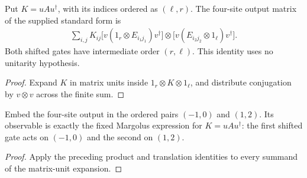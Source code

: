 \begin{lemma}
    \label{lem:mpu_two_link_output_matrix_units}
    \leanok
    Put $K=uAu^\dagger$, with its indices ordered as $(\ell,r)$.
    The four-site output matrix of the supplied standard form is
    \begin{align}
        \sum_{i,j}K_{ij}
        \bigl[v(1_r\otimes E_{i_1j_1})v^\dagger\bigr]
        \otimes
        \bigl[v(E_{i_2j_2}\otimes 1_\ell)v^\dagger\bigr].
    \end{align}
    Both shifted gates have intermediate order $(r,\ell)$. This identity
    uses no unitarity hypothesis.
\end{lemma}
\begin{proof}
    \leanok
    Expand $K$ in matrix units inside $1_r\otimes K\otimes 1_\ell$,
    and distribute conjugation by $v\otimes v$ across the finite sum.
\end{proof}

\begin{lemma}
    \label{lem:qca_tensor_output_fixed_local_rule}
    \leanok
    Embed the four-site output in the ordered pairs $(-1,0)$ and $(1,2)$.
    Its observable is exactly the fixed Margolus expression for $K=uAu^\dagger$:
    the first shifted gate acts on $(-1,0)$ and the second on $(1,2)$.
\end{lemma}
\begin{proof}
    \leanok
    Apply the preceding product and translation identities to every
    summand of the matrix-unit expansion.
\end{proof}

